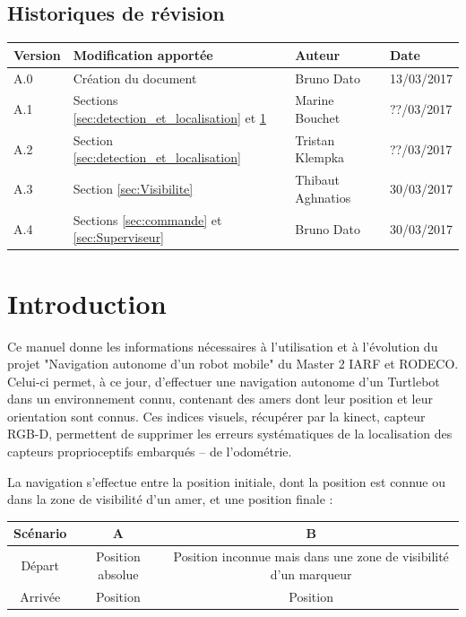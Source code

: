 \documentclass[10pt,a4paper]{article}
\begin{document}
\subsection*{Historiques de révision}

\begin{center}
    \begin{tabular}{| l | l | l | l |}
    \hline
     \rowcolor{gray} Version & Modification apportée & Auteur & Date \\ \hline
    A.0 & Création du document & Bruno Dato & 13/03/2017\\ \hline
    A.1 & Sections \ref{sec:detection_et_localisation} et \ref{sec:introduction} & Marine Bouchet & ??/03/2017\\ \hline
    A.2 & Section \ref{sec:detection_et_localisation} & Tristan Klempka & ??/03/2017\\ \hline
    A.3 & Section \ref{sec:Visibilite} & Thibaut Aghnatios & 30/03/2017\\ \hline
    A.4 & Sections \ref{sec:commande} et \ref{sec:Superviseur} & Bruno Dato & 30/03/2017\\ \hline
     
    \end{tabular}
\end{center}

\newpage
\tableofcontents
\newpage

\section{Introduction}
\label{sec:introduction}

Ce manuel donne les informations nécessaires à l'utilisation et à l'évolution du projet "Navigation autonome d'un robot mobile" du Master 2 IARF et RODECO. Celui-ci permet, à ce jour, d'effectuer une navigation autonome  d'un Turtlebot dans un environnement connu, contenant des amers dont leur position et leur orientation sont connus. Ces indices visuels, récupérer par la kinect, capteur RGB-D, permettent de supprimer les erreurs systématiques de la localisation des capteurs proprioceptifs embarqués -- de l'odométrie. 

La navigation s'effectue entre la position initiale, dont la position est connue ou dans la zone de visibilité d'un amer, et une position finale : 

\begin{tabular}{c|c|c}
Scénario & A & B \\ \hline
Départ & Position absolue & Position inconnue mais dans une zone de visibilité d'un marqueur \\  \hline
Arrivée & Position & Position 
\end{tabular} \\
\end{document}

